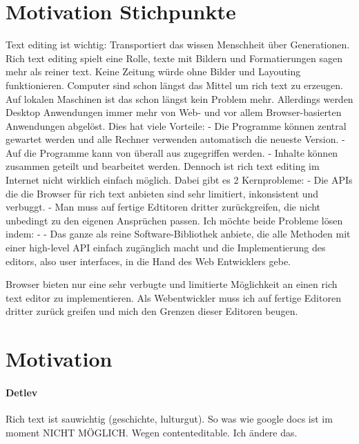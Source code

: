

\section{Motivation Stichpunkte}

Text editing ist wichtig: Transportiert das wissen Menschheit über Generationen.
Rich text editing spielt eine Rolle, texte mit Bildern und Formatierungen sagen mehr als reiner text. Keine Zeitung würde ohne Bilder und Layouting funktionieren.
Computer sind schon längst das Mittel um rich text zu erzeugen.
Auf lokalen Maschinen ist das schon längst kein Problem mehr.
Allerdings werden Desktop Anwendungen immer mehr von Web- und vor allem Browser-basierten Anwendungen abgelöst.
Dies hat viele Vorteile:
 - Die Programme können zentral gewartet werden und alle Rechner verwenden automatisch die neueste Version.
 - Auf die Programme kann von überall aus zugegriffen werden.
 - Inhalte können zusammen geteilt und bearbeitet werden.
Dennoch ist rich text editing im Internet nicht wirklich einfach möglich.
Dabei gibt es 2 Kernprobleme:
 - Die APIs die die Browser für rich text anbieten sind sehr limitiert, inkonsistent und verbuggt.
 - Man muss auf fertige Edtitoren dritter zurückgreifen, die nicht unbedingt zu den eigenen Ansprüchen passen.
Ich möchte beide Probleme lösen indem:
 - 
 - Das ganze als reine Software-Bibliothek anbiete, die alle Methoden mit einer high-level API einfach zugänglich macht und die Implementierung des editors, also user interfaces, in die Hand des Web Entwicklers gebe.


Browser bieten nur eine sehr verbugte und limitierte Möglichkeit an einen rich text editor zu implementieren.
Als Webentwickler muss ich auf fertige Editoren dritter zurück greifen und mich den Grenzen dieser Editoren beugen.



\section{Motivation}

\paragraph{Detlev} Rich text ist sauwichtig (geschichte, lulturgut). So was wie google docs ist im moment NICHT MÖGLICH. Wegen contenteditable. Ich ändere das.


